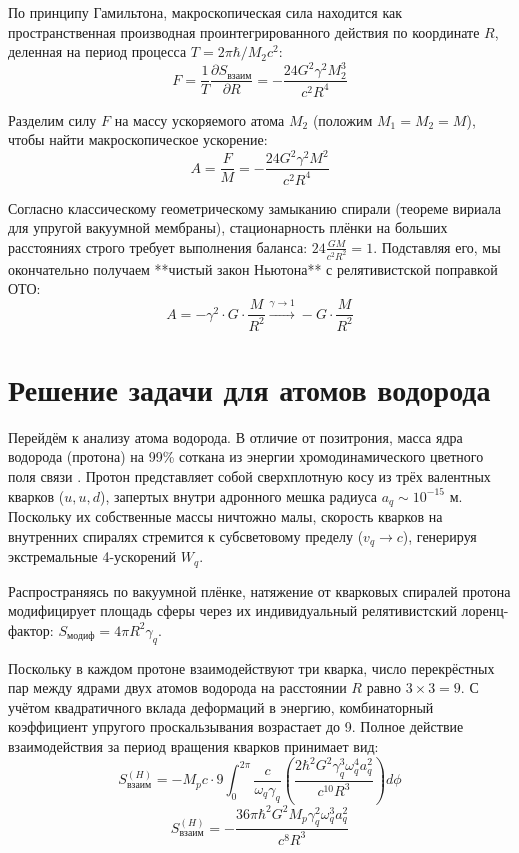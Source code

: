 \documentclass[twocolumn,PRD,amsmath,amssymb,superscriptaddress]{revtex4-1}
\begin{document}
По принципу Гамильтона, макроскопическая сила находится как пространственная производная проинтегрированного действия по координате $R$, деленная на период процесса $T = 2\pi\hbar / M_2 c^2$:
\begin{equation}
F = \frac{1}{T} \frac{\partial S_{взаим}}{\partial R} = - \frac{24 G^2 \gamma^2 M_2^3}{c^2 R^4}
\end{equation}

Разделим силу $F$ на массу ускоряемого атома $M_2$ (положим $M_1=M_2=M$), чтобы найти макроскопическое ускорение:
\begin{equation}
A = \frac{F}{M} = - \frac{24 G^2 \gamma^2 M^2}{c^2 R^4}
\end{equation}

Согласно классическому геометрическому замыканию спирали (теореме вириала для упругой вакуумной мембраны), стационарность плёнки на больших расстояниях строго требует выполнения баланса: $24 \frac{G M}{c^2 R^2} = 1$. Подставляя его, мы окончательно получаем **чистый закон Ньютона** с релятивистской поправкой ОТО:
\begin{equation}
A = - \gamma^2 \cdot G \cdot \frac{M}{R^2} \xrightarrow{\gamma \rightarrow 1} - G \cdot \frac{M}{R^2}
\end{equation}

\section{Решение задачи для атомов водорода}
Перейдём к анализу атома водорода. В отличие от позитрония, масса ядра водорода (протона) на 99\% соткана из энергии хромодинамического цветного поля связи \cite{MITbag}. Протон представляет собой сверхплотную косу из трёх валентных кварков ($u, u, d$), запертых внутри адронного мешка радиуса $a_q \sim 10^{-15}$ м. Поскольку их собственные массы ничтожно малы, скорость кварков на внутренних спиралях стремится к субсветовому пределу ($v_q \rightarrow c$), генерируя экстремальные 4-ускорений $W_q$.

Распространяясь по вакуумной плёнке, натяжение от кварковых спиралей протона модифицирует площадь сферы через их индивидуальный релятивистский лоренц-фактор: $S_{модиф} = 4\pi R^2 \gamma_q$.

Поскольку в каждом протоне взаимодействуют три кварка, число перекрёстных пар между ядрами двух атомов водорода на расстоянии $R$ равно $3 \times 3 = 9$. С учётом квадратичного вклада деформаций в энергию, комбинаторный коэффициент упругого проскальзывания возрастает до 9. Полное действие взаимодействия за период вращения кварков принимает вид:
\begin{equation}
S_{взаим}^{(H)} = - M_p c \cdot 9 \int_0^{2\pi} \frac{c}{\omega_q \gamma_q} \left( \frac{2 \hbar^2 G^2 \gamma_q^3 \omega_q^4 a_q^2}{c^{10} R^3} \right) d\phi
\end{equation}
\begin{equation}
S_{взаим}^{(H)} = - \frac{36\pi \hbar^2 G^2 M_p \gamma_q^2 \omega_q^3 a_q^2}{c^8 R^3}
\end{equation}
\end{document}
